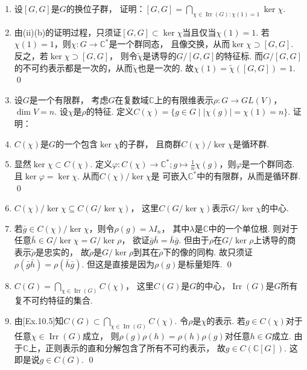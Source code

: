 \begin{enumerate}
    \item[(iii)] 设$[G,G]$是$G$的换位子群，
        证明：$[G,G] = \bigcap\limits_{\chi \in \operatorname{Irr}(G) : \chi(1)=1}\ker \chi$.
    \item[\textbf{证明:}]
        由(ii)(b)的证明过程，只须证$[G,G] \subset \ker\chi$当且仅当$\chi(1)=1$.
        若$\chi(1)=1$，则$\chi:G \rightarrow \mathbb{C}^{*}$是一个群同态，
        且像交换，从而$\ker\chi \supset [G,G]$.
        反之，若$\ker\chi \supset [G,G]$，
        则令$\widetilde{\chi}$是诱导的$G/[G,G]$的特征标.
        而$G/[G,G]$的不可约表示都是一次的，从而$\widetilde{\chi}$也是一次的.
        故$\chi(1)=\widetilde{\chi}([G,G])=1$. \qed

    \item[11.7] 设$G$是一个有限群，
        考虑$G$在复数域$\mathbb{C}$上的有限维表示$\rho:G \rightarrow GL(V)$，
        $\dim V = n$. 设$\chi$是$\rho$的特征. 
        定义$C(\chi) = \{g \in G \mid |\chi(g)| = \chi(1) = n\}$. 证明：
        
        \item[(i)] $C(\chi)$是$G$的一个包含$\ker\chi$的子群，
            且商群$C(\chi)/\ker\chi$是循环群.
        \item[\textbf{证明:}]
            显然$\ker \chi \subset C(\chi)$.
            定义$\varphi:C(\chi) \rightarrow \mathbb{C}^{*};
            g \mapsto \frac{1}{n}\chi(g)$，则$\varphi$是一个群同态.
            且$\ker\varphi = \ker\chi$. 从而$C(\chi)/\ker\chi$是
            可嵌入$\mathbb{C}^{*}$中的有限群，从而是循环群. \qed

        \item[(ii)] $C(\chi)/\ker\chi \subseteq C(G/\ker\chi)$，
            这里$C(G/\ker\chi)$表示$G/\ker\chi$的中心.
        \item[\textbf{证明:}]
            若$\bar{g} \in C(\chi)/\ker\chi$，则令$\rho(g)=\lambda I_{n}$，
            其中$\lambda$是$\mathbb{C}$中的一个单位根.
            则对于任意$\bar{h} \in G/\ker\chi = G/\ker \rho$，
            欲证$\bar{g}\bar{h}=\bar{h}\bar{g}$.
            但由于$\rho$在$G/\ker\rho$上诱导的商表示$\widetilde{\rho}$是忠实的，
            故$\widetilde{\rho}$是$G/\ker\rho$到其在$\widetilde{\rho}$下的像的同构.
            故只须证$\rho(\bar{g}\bar{h}) = \rho(\bar{h}\bar{g})$. 
            但这是直接是因为$\rho(g)$是标量矩阵. \qed

        \item[(iii)] $C(G) = \bigcap\limits_{\chi \in \operatorname{Irr}(G)}C(\chi)$，
            这里$C(G)$是$G$的中心，$\operatorname{Irr}(G)$是$G$所有复不可约特征的集合.
        \item[\textbf{证明:}]
            由[Ex.10.5]知$C(G) \subset \bigcap\limits_{\chi \in \operatorname{Irr}(G)}C(\chi)$.
            令$\rho$是$\chi$的表示. 
            若$g \in C(\chi)$对于任意$\chi \in \operatorname{Irr}(G)$成立，
            则$\rho(g)\rho(h)=\rho(h)\rho(g)$对任意$h \in G$成立.
            由于$\mathbb{C}$上，正则表示的直和分解包含了所有不可约表示，
            故$g \in C(\mathbb{C}[G])$.
            这即是说$g \in C(G)$. \qed


\end{enumerate}
